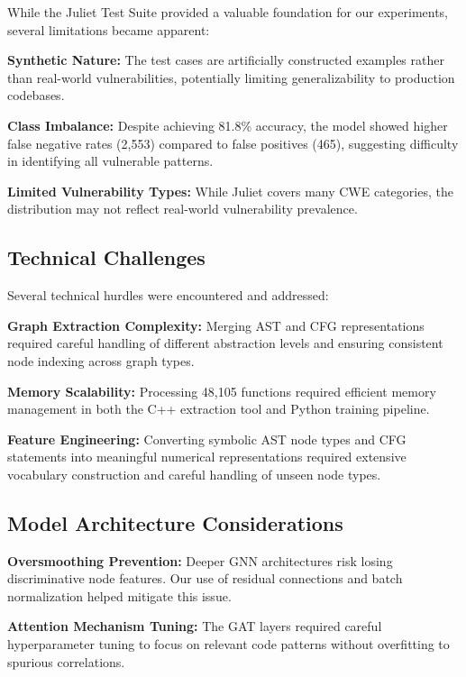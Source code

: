 While the Juliet Test Suite provided a valuable foundation for our experiments, several limitations became apparent:

\textbf{Synthetic Nature:} The test cases are artificially constructed examples rather than real-world vulnerabilities, potentially limiting generalizability to production codebases.

\textbf{Class Imbalance:} Despite achieving 81.8\% accuracy, the model showed higher false negative rates (2,553) compared to false positives (465), suggesting difficulty in identifying all vulnerable patterns.

\textbf{Limited Vulnerability Types:} While Juliet covers many CWE categories, the distribution may not reflect real-world vulnerability prevalence.

\subsection{Technical Challenges}

Several technical hurdles were encountered and addressed:

\textbf{Graph Extraction Complexity:} Merging AST and CFG representations required careful handling of different abstraction levels and ensuring consistent node indexing across graph types.

\textbf{Memory Scalability:} Processing 48,105 functions required efficient memory management in both the C++ extraction tool and Python training pipeline.

\textbf{Feature Engineering:} Converting symbolic AST node types and CFG statements into meaningful numerical representations required extensive vocabulary construction and careful handling of unseen node types.

\subsection{Model Architecture Considerations}

\textbf{Oversmoothing Prevention:} Deeper GNN architectures risk losing discriminative node features. Our use of residual connections and batch normalization helped mitigate this issue.

\textbf{Attention Mechanism Tuning:} The GAT layers required careful hyperparameter tuning to focus on relevant code patterns without overfitting to spurious correlations.

